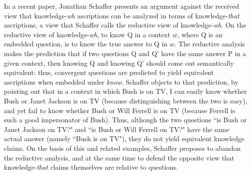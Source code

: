 
In a recent paper, Jonathan Schaffer presents an argument against
the received view that knowledge-\emph{wh} ascriptions can be
analyzed in terms of knowledge-\emph{that} ascriptions, a view
that Schaffer calls the reductive view of knowledge-\emph{wh}. On
the reductive view of knowledge-\emph{wh}, to know Q in a context
$w$, where Q is an embedded question, is to know the true answer
to Q in $w$. The reductive analysis makes the prediction that if
two questions Q and Q' have the same answer P in a given context,
then knowing Q and knowing Q' should come out semantically
equivalent: thus, convergent questions are predicted to yield
equivalent ascriptions when embedded under \emph{know}. Schaffer
objects to that prediction, by pointing out that in a context in
which Bush is on TV, I can easily know whether Bush or Janet
Jackson is on TV (because distinguishing between the two is easy),
and yet fail to know whether Bush or Will Ferrell is on TV
(because Ferrell is such a good impersonator of Bush). Thus,
although the two questions ``is Bush or Janet Jackson on TV?" and
``is Bush or Will Ferrell on TV?" have the same actual answer
(namely ``Bush is on TV"), they do not yield equivalent knowledge
claims. On the basis of this and related examples, Schaffer
proposes to abandon the reductive analysis, and at the same time
to defend the opposite view that knowledge-\emph{that} claims
themselves are relative to questions.


